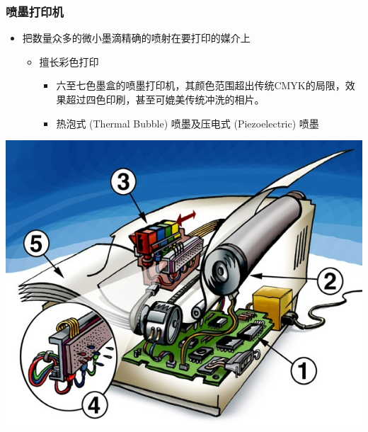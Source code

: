 \documentclass{beamer}
\newcommand{\fullPageImage}[2]{
	{
		\usebackgroundtemplate{\texttt{[image: \#1]}}
		\frame[plain]{#2}
	}
}
\begin{document}
\fullPageImage{images/800px-Tandy1000HX.jpg}{\transwipe}%

\begin{frame}
	\frametitle{喷墨打印机}
	\begin{itemize}
		\item 把数量众多的微小墨滴精确的喷射在要打印的媒介上
		\begin{itemize}
			\item 擅长彩色打印
			\begin{itemize}
				\item 六至七色墨盒的喷墨打印机，其颜色范围超出传统CMYK的局限，效果超过四色印刷，甚至可媲美传统冲洗的相片。
				\item 热泡式 (Thermal Bubble) 喷墨及压电式 (Piezoelectric) 喷墨
			\end{itemize}
		\end{itemize}
	\end{itemize}
	\begin{center}
	\includegraphics[height=.5\textheight]{images/bubblejet-print-principle.jpg}%
	\end{center}
\end{frame}

\fullPageImage{images/bj-printer-flow.jpg}{\transwipe}
\fullPageImage{images/continous-flow-ink-jet.jpg}{\transwipe}%
\end{document}
